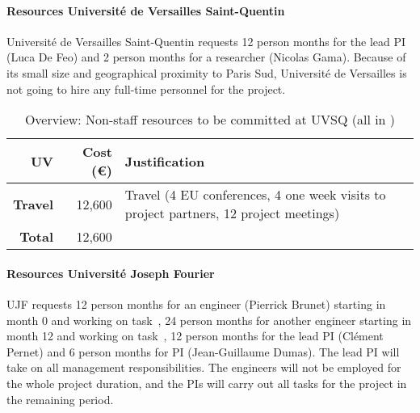 \paragraph{Resources Universit\'{e} de Versailles Saint-Quentin}

Universit\'{e} de Versailles Saint-Quentin requests 12 person months
for the lead PI (Luca De Feo) and 2 person months for a researcher
(Nicolas Gama). Because of its small size and geographical proximity
to Paris Sud, Universit\'{e} de Versailles is not going to hire any
full-time personnel for the project.

\bigskip
\begin{table}[H]
\begin{tabular}{|r|r|p{8.5cm}|}
\hline
\textbf{UV} & \textbf{Cost (\euro)} & \textbf{Justification} \\\hline
\textbf{Travel} & 12,600 & Travel (4 EU conferences, 4 one week visits to project partners, 12 project meetings)\\\hline
\textbf{Total} & 12,600\\\cline{1-2}
\end{tabular}
\caption{Overview: Non-staff resources to be committed at UVSQ (all in \texteuro)}\vspace*{-1em}
\end{table}





\paragraph{Resources Universit\'{e} Joseph Fourier}

UJF requests 12 person months for an engineer (Pierrick Brunet) starting in
month 0 and working on task~, 24 person
months for another engineer starting in month 12 and working on task~, 12 person months for the lead PI
(Clément Pernet) and 6 person months for PI (Jean-Guillaume Dumas). 
The lead PI will take on all management responsibilities. The
engineers will not be employed for the whole project duration, and
the PIs will carry out all tasks for the project in the remaining
period.

